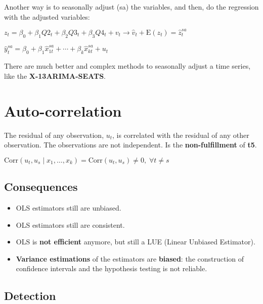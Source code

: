 \documentclass[10pt, a4paper, landscape]{article}
\newcommand{\E}{\mathrm{E}}
\newcommand{\Corr}{\mathrm{Corr}}
\begin{document}
\begin{multicols}{3}
		Another way is to seasonally adjust (sa) the variables, and then, do the regression with the adjusted variables:
		
		\begin{center}
			$z_{t} = \beta_{0} + \beta_{1} Q2_{t} + \beta_{2} Q3_{t} + \beta_{3} Q4_{t} + v_{t} \rightarrow \hat{v}_{t} + \E(z_{t}) = \hat{z}_{t}^{sa}$
			
			$\hat{y}_{t}^{sa}= \beta_{0} + \beta_{1} \hat{x}_{1t}^{sa} + \cdots + \beta_{k} \hat{x}_{kt}^{sa} + u_{t}$
		\end{center}
		
		There are much better and complex methods to seasonally adjust a time series, like the \textbf{X-13ARIMA-SEATS}.
		
		\columnbreak
		
		\section*{Auto-correlation}
		
		The residual of any observation, $u_{t}$, is correlated with the residual of any other observation. The observations are not independent. Is the \textbf{non-fulfillment} of \textbf{t5}.
		
		\begin{center}
			$\Corr(u_{t}, u_{s} \mid x_{1}, \ldots, x_{k}) = \Corr(u_{t}, u_{s}) \neq 0, \; \forall t \neq s$
		\end{center}
		
		\subsection*{Consequences}
		
		\begin{itemize}[leftmargin=*]
			\item OLS estimators still are unbiased.
			\item OLS estimators still are consistent.
			\item OLS is \textbf{not efficient} anymore, but still a LUE (Linear Unbiased Estimator).
			\item \textbf{Variance estimations} of the estimators are \textbf{biased}: the construction of confidence intervals and the hypothesis testing is not reliable.
		\end{itemize}
		
		\subsection*{Detection}
		

\end{multicols}
\end{document}

